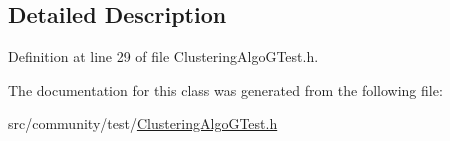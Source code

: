 \subsection{Detailed Description}


Definition at line 29 of file Clustering\-Algo\-G\-Test.\-h.



The documentation for this class was generated from the following file\-:\begin{DoxyCompactItemize}
\item 
src/community/test/\hyperlink{_clustering_algo_g_test_8h}{Clustering\-Algo\-G\-Test.\-h}\end{DoxyCompactItemize}
